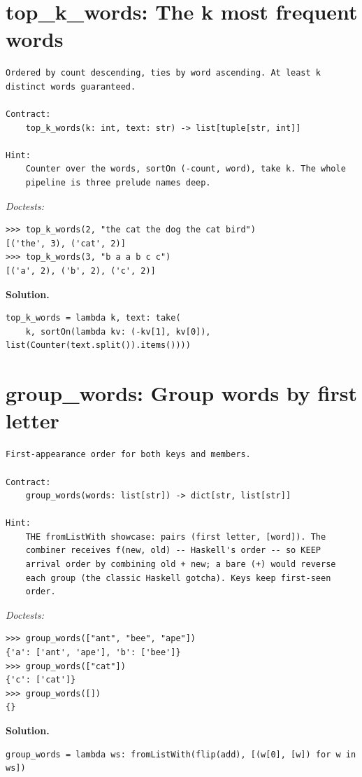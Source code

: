\documentclass[11pt,letterpaper]{book}
\begin{document}
\section{top\_k\_words: The k most frequent words}
\begin{lstlisting}[style=spec]
Ordered by count descending, ties by word ascending. At least k
distinct words guaranteed.

Contract:
    top_k_words(k: int, text: str) -> list[tuple[str, int]]

Hint:
    Counter over the words, sortOn (-count, word), take k. The whole
    pipeline is three prelude names deep.
\end{lstlisting}
\noindent\textit{Doctests:}
\begin{lstlisting}[style=spec]
>>> top_k_words(2, "the cat the dog the cat bird")
[('the', 3), ('cat', 2)]
>>> top_k_words(3, "b a a b c c")
[('a', 2), ('b', 2), ('c', 2)]
\end{lstlisting}
\noindent\textbf{Solution.}
\begin{lstlisting}[style=code]
top_k_words = lambda k, text: take(
    k, sortOn(lambda kv: (-kv[1], kv[0]), list(Counter(text.split()).items())))
\end{lstlisting}

\section{group\_words: Group words by first letter}
\begin{lstlisting}[style=spec]
First-appearance order for both keys and members.

Contract:
    group_words(words: list[str]) -> dict[str, list[str]]

Hint:
    THE fromListWith showcase: pairs (first letter, [word]). The
    combiner receives f(new, old) -- Haskell's order -- so KEEP
    arrival order by combining old + new; a bare (+) would reverse
    each group (the classic Haskell gotcha). Keys keep first-seen
    order.
\end{lstlisting}
\noindent\textit{Doctests:}
\begin{lstlisting}[style=spec]
>>> group_words(["ant", "bee", "ape"])
{'a': ['ant', 'ape'], 'b': ['bee']}
>>> group_words(["cat"])
{'c': ['cat']}
>>> group_words([])
{}
\end{lstlisting}
\noindent\textbf{Solution.}
\begin{lstlisting}[style=code]
group_words = lambda ws: fromListWith(flip(add), [(w[0], [w]) for w in ws])
\end{lstlisting}
\end{document}
